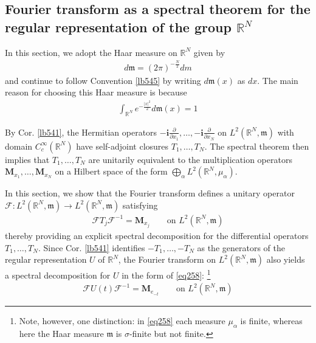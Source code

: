 \documentclass[12pt,b5paper,notitlepage]{article}
\theoremstyle{definition}
\theoremstyle{plain}
\newcommand{\wht}{\widehat}
\newcommand{\wch}{\widecheck}
\newcommand{\im}{\mathbf{i}}
\newcommand{\Rbb}{\mathbb R}
\newcommand{\mk}{\mathfrak m}
\newcommand{\MF}{\mathcal F}
\newcommand{\MS}{\mathcal S}
\newcommand{\Mbf}{\mathbf M}
\numberwithin{equation}{section}
\begin{document}
\subsection{Fourier transform as a spectral theorem for the regular representation of the group $\Rbb^N$}\label{lb525}



In this section, we adopt the Haar measure on $\Rbb^N$ given by
\begin{align*}
d\mk=(2\pi)^{-\frac N2}dm
\end{align*}
and continue to follow Convention \ref{lb545} by writing $d\mk(x)$ as $dx$. The main reason for choosing this Haar measure is because
\begin{align}\label{eq263}
\int_{\Rbb^N}e^{-\frac{|x|^2}2}d\mk(x)=1
\end{align}

By Cor. \ref{lb541}, the Hermitian operators $-\im\frac{\partial}{\partial x_1},\dots,-\im\frac{\partial}{\partial x_N}$ on $L^2(\Rbb^N,\mk)$ with domain $C_c^\infty(\Rbb^N)$ have self-adjoint closures $T_1,\dots,T_N$. The spectral theorem then implies that $T_1,\dots,T_N$ are unitarily equivalent to the multiplication operators $\Mbf_{x_1},\dots,\Mbf_{x_N}$ on a Hilbert space of the form $\bigoplus_\alpha L^2(\Rbb^N,\mu_\alpha)$.

In this section, we show that the Fourier transform defines a unitary operator $\MF:L^2(\Rbb^N,\mk)\rightarrow L^2(\Rbb^N,\mk)$ satisfying
\begin{align*}
\MF T_j \MF^{-1}=\Mbf_{x_j}\qquad\text{on }L^2(\Rbb^N,\mk)
\end{align*}
thereby providing an explicit spectral decomposition for the differential operators $T_1,\dots,T_N$. Since Cor. \ref{lb541} identifies $-T_1,\dots,-T_N$ as the generators of the regular representation $U$ of $\Rbb^N$, the Fourier transform on $L^2(\Rbb^N,\mk)$ also yields a spectral decomposition for $U$ in the form of \eqref{eq258}: \footnote{Note, however, one distinction: in \eqref{eq258} each measure $\mu_\alpha$ is finite, whereas here the Haar measure $\mk$ is $\sigma$-finite but not finite.}
\begin{align*}
\MF U(t)\MF^{-1}=\Mbf_{e_{-t}}\qquad\text{on }L^2(\Rbb^N,\mk)
\end{align*}

\end{document}
